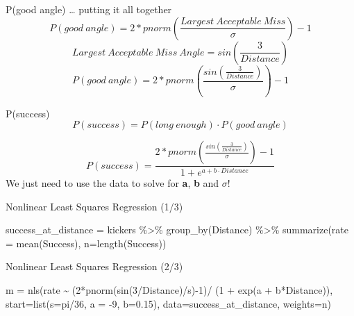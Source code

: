 \documentclass[
  ignorenonframetext,
]{beamer}
\newenvironment{Shaded}{\begin{snugshade}}{\end{snugshade}}
\newcommand{\AttributeTok}[1]{\textcolor[rgb]{0.77,0.63,0.00}{#1}}
\newcommand{\DecValTok}[1]{\textcolor[rgb]{0.00,0.00,0.81}{#1}}
\newcommand{\FloatTok}[1]{\textcolor[rgb]{0.00,0.00,0.81}{#1}}
\newcommand{\FunctionTok}[1]{\textcolor[rgb]{0.00,0.00,0.00}{#1}}
\newcommand{\NormalTok}[1]{#1}
\newcommand{\OtherTok}[1]{\textcolor[rgb]{0.56,0.35,0.01}{#1}}
\newcommand{\SpecialCharTok}[1]{\textcolor[rgb]{0.00,0.00,0.00}{#1}}
\begin{document}
\begin{frame}{P(good angle) \ldots{} putting it all together}
\protect\hypertarget{pgood-angle-putting-it-all-together}{}
\[ P(good\ angle) = 2*pnorm(\frac{Largest\ Acceptable\ Miss}{\sigma}) - 1 \]
\[Largest\ Acceptable\ Miss\ Angle = sin(\frac{3}{Distance})\]
\[P(good\ angle) = 2*pnorm(\frac{sin(\frac{3}{Distance})}{\sigma}) - 1\]
\end{frame}

\begin{frame}{P(success)}
\protect\hypertarget{psuccess}{}
\[P(success) = P(long\ enough)\cdot P(good\ angle)\]

\[P(success) = \frac{2*pnorm(\frac{sin(\frac{3}{Distance})}{\sigma}) - 1}{1 + e^{a + b\cdot Distance}}\]
We just need to use the data to solve for \textbf{a}, \textbf{b} and
\textbf{\(\sigma\)}!
\end{frame}

\begin{frame}[fragile]{Nonlinear Least Squares Regression (1/3)}
\protect\hypertarget{nonlinear-least-squares-regression-13}{}
\begin{Shaded}
\begin{Highlighting}[]
\NormalTok{success\_at\_distance }\OtherTok{=} 
\NormalTok{kickers }\SpecialCharTok{\%\textgreater{}\%} \FunctionTok{group\_by}\NormalTok{(Distance) }\SpecialCharTok{\%\textgreater{}\%} 
  \FunctionTok{summarize}\NormalTok{(}\AttributeTok{rate =} \FunctionTok{mean}\NormalTok{(Success), }
            \AttributeTok{n=}\FunctionTok{length}\NormalTok{(Success))}
\end{Highlighting}
\end{Shaded}
\end{frame}

\begin{frame}[fragile]{Nonlinear Least Squares Regression (2/3)}
\protect\hypertarget{nonlinear-least-squares-regression-23}{}
\begin{Shaded}
\begin{Highlighting}[]
\NormalTok{m }\OtherTok{=} \FunctionTok{nls}\NormalTok{(rate }\SpecialCharTok{\textasciitilde{}}\NormalTok{ (}\DecValTok{2}\SpecialCharTok{*}\FunctionTok{pnorm}\NormalTok{(}\FunctionTok{sin}\NormalTok{(}\DecValTok{3}\SpecialCharTok{/}\NormalTok{Distance)}\SpecialCharTok{/}\NormalTok{s)}\SpecialCharTok{{-}}\DecValTok{1}\NormalTok{)}\SpecialCharTok{/}
\NormalTok{              (}\DecValTok{1} \SpecialCharTok{+} \FunctionTok{exp}\NormalTok{(a }\SpecialCharTok{+}\NormalTok{ b}\SpecialCharTok{*}\NormalTok{Distance)),}
               \AttributeTok{start=}\FunctionTok{list}\NormalTok{(}\AttributeTok{s=}\NormalTok{pi}\SpecialCharTok{/}\DecValTok{36}\NormalTok{, }\AttributeTok{a =} \SpecialCharTok{{-}}\DecValTok{9}\NormalTok{, }\AttributeTok{b=}\FloatTok{0.15}\NormalTok{),}
               \AttributeTok{data=}\NormalTok{success\_at\_distance,}
               \AttributeTok{weights=}\NormalTok{n)}
\end{Highlighting}
\end{Shaded}
\end{frame}
\end{document}
